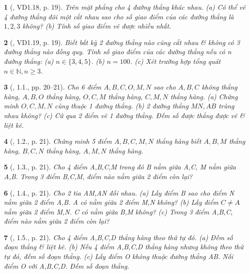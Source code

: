 \documentclass{article}
\newtheorem{baitoan}{}
\begin{document}
\begin{baitoan}[\cite{TLCT_THCS_Toan_6_hinh_hoc}, VD1.18, p. 19]
	Trên mặt phẳng cho 4 đường thẳng khác nhau. (a) Có thể vẽ 4 đường thẳng đôi một cắt nhau sao cho số giao điểm của các đường thẳng là $1,2,3$ không? (b) Tính số giao điểm vẽ được nhiều nhất.
\end{baitoan}

\begin{baitoan}[\cite{TLCT_THCS_Toan_6_hinh_hoc}, VD1.19, p. 19]
	Biết bất kỳ 2 đường thẳng nào cũng cắt nhau \& không có 3 đường thẳng nào đồng quy. Tính số giao điểm của các đường thẳng nếu có n đường thẳng: (a) $n\in\{3,4,5\}$. (b) $n = 100$. (c) Xét trường hợp tổng quát $n\in\mathbb{N},n\ge3$.
\end{baitoan}

\begin{baitoan}[\cite{TLCT_THCS_Toan_6_hinh_hoc}, 1.1., pp. 20--21]
	Cho 6 điểm $A,B,C,O,M,N$ sao cho $A,B,C$ không thẳng hàng, $A,B,O$ thẳng hàng, $O,C,M$ thẳng hàng, $C,M,N$ thẳng hàng. (a) Chứng minh $O,C,M,N$ cùng thuộc 1 đường thẳng. (b) 2 đường thẳng $MN,AB$ trùng nhau không? (c) Cứ qua 2 điểm vẽ 1 đường thẳng. Đếm số được thẳng được vẽ \& liệt kê.
\end{baitoan}

\begin{baitoan}[\cite{TLCT_THCS_Toan_6_hinh_hoc}, 1.2., p. 21]
	Chứng minh 5 điểm $A,B,C,M,N$ thẳng hàng biết $A,B,M$ thẳng hàng, $B,C,N$ thẳng hàng, $A,M,N$ thẳng hàng.
\end{baitoan}

\begin{baitoan}[\cite{TLCT_THCS_Toan_6_hinh_hoc}, 1.3., p. 21]
	Cho 4 điểm A,B,C,M trong đó B nằm giữa A,C, M nằm giữa A,B. Trong 3 điểm B,C,M, điểm nào nằm giữa 2 điểm còn lại?
\end{baitoan}

\begin{baitoan}[\cite{TLCT_THCS_Toan_6_hinh_hoc}, 1.4., p. 21]
	Cho 2 tia AM,AN đối nhau. (a) Lấy điểm B sao cho điểm N nằm giữa 2 điểm A,B. A có nằm giữa 2 điểm M,N không? (b) Lấy điểm $C\ne A$ nằm giữa 2 điểm M,N. C có nằm giữa B,M không? (c) Trong 3 điểm A,B,C, điểm nào nằm giữa 2 điểm còn lại?
\end{baitoan}

\begin{baitoan}[\cite{TLCT_THCS_Toan_6_hinh_hoc}, 1.5., p. 21]
	Cho 4 điểm A,B,C,D thẳng hàng theo thứ tự đó. (a) Đếm số đoạn thẳng \& liệt kê. (b) Nếu 4 điểm A,B,C,D thẳng hàng nhưng không theo thứ tự đó, đếm số đoạn thẳng. (c) Lấy điểm O không thuộc đường thẳng AB. Nối điểm O với A,B,C,D. Đếm số đoạn thẳng.
\end{baitoan}
\end{document}

